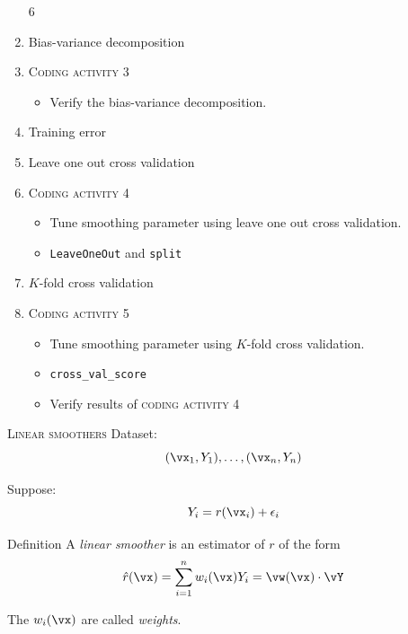 \documentclass{beamer}
\begin{document}
\begin{frame}{}
    \begin{enumerate}
        \setcounter{enumi}6
        \item Bias-variance decomposition
        \item \textsc{Coding activity 3}
        \begin{itemize}
            \item Verify the bias-variance decomposition.
        \end{itemize}
        \item Training error
        \item Leave one out cross validation
        \item \textsc{Coding activity 4}
        \begin{itemize}
            \item Tune smoothing parameter using leave one out cross validation.
            \item \texttt{LeaveOneOut} and \texttt{split}
        \end{itemize}
        \item $K$-fold cross validation
        \item \textsc{Coding activity 5}
        \begin{itemize}
            \item Tune smoothing parameter using $K$-fold cross validation.
            \item \texttt{cross\_val\_score}
            \item Verify results of \textsc{coding activity 4}
        \end{itemize}
    \end{enumerate}
    
\end{frame}
\begin{frame}{\textsc{Linear smoothers}}
    Dataset:
    \[
        (\vx_1, Y_1),\ldots,(\vx_n, Y_n)
    \]
    
    Suppose:
    \[
        Y_i = r(\vx_i) + \epsilon_i
    \]

    \begin{block}{Definition}
    A \emph{linear smoother} is an estimator of $r$ of the form
    \[
        \hat r(\vx) = \sum_{i=1}^n w_i(\vx)Y_i = \vw(\vx)\cdot \vY
    \]
    \end{block}

    The $w_i(\vx)$ are called \emph{weights}.
\end{frame}
\end{document}
